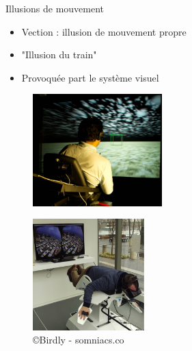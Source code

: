 \documentclass[compress, noflama]{beamer}
\begin{document}
\begin{frame}{Illusions de mouvement}

\begin{itemize}
\item Vection : illusion de mouvement propre
\item "Illusion du train"
\item Provoquée part le système visuel
\end{itemize}
\begin{multicols}{2}
\begin{figure}
\centering
\includegraphics[width=5cm]{images/opticflow}
\caption{\cite{Riecke2005}}
\end{figure}
\begin{figure}
\centering
\includegraphics[width=4.3cm]{images/birdly}
\caption{\copyright Birdly - somniacs.co}
\end{figure}
\end{multicols}
\end{frame}
\end{document}

